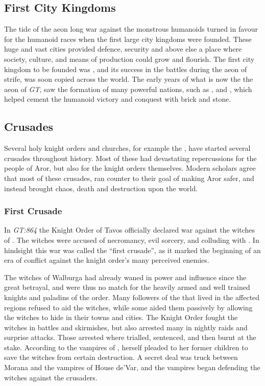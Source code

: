 \subsection{First City Kingdoms}

The tide of the aeon long war against the monstrous humanoids turned in favour
for the humanoid races when the first large city kingdoms were founded. These
huge and vast cities provided defence, security and above else a place where
society, culture, and means of production could grow and flourish. The first
city kingdom to be founded was , and its success
in the battles during the aeon of strife, was soon copied across the world.
The early years of what is now the the aeon of \emph{GT}, saw the formation
of many powerful nations, such as , 
and , which helped cement the humanoid victory and
conquest with brick and stone.

\subsection{Crusades}
\label{sec:Crusades}

Several holy knight orders and churches, for example the , have started several crusades throughout history. Most of
these had devastating repercussions for the people of Aror, but also for the
knight orders themselves. Modern scholars agree that most of these crusades,
ran counter to their goal of making Aror safer, and instead brought chaos,
death and destruction upon the world.

\subsubsection{First Crusade}
\label{sec:First Crusade}

In \emph{GT:864} the Knight Order of Tavos officially declared war against the
witches of . The witches were accused of necromancy,
evil sorcery, and colluding with . In hindsight this war
was called the ``first crusade'', as it marked the beginning of an era of
conflict against the knight order's many perceived enemies.

The witches of Walburga had already waned in power and influence since the
great betrayal, and were thus no match for the heavily armed and well trained
knights and paladins of the order. Many followers of the 
that lived in the affected regions refused to aid the witches, while some
aided them passively by allowing the witches to hide in their towns and
cities. The Knight Order fought the witches in battles and skirmishes, but also
arrested many in nightly raids and surprise attacks. Those arrested where
trialled, sentenced, and then burnt at the stake. According to the vampires of
,  herself pleaded to her former
children to save the witches from certain destruction. A secret deal was truck
between Morana and the vampires of House de'Var, and the vampires began
defending the witches against the crusaders.

